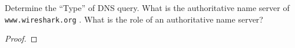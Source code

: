 \documentclass[../../main.tex]{subfiles}
\begin{document}
\begin{wts}
Determine the “Type” of DNS query. What is the authoritative name server of \lstinline{www.wireshark.org} . What is the role of an authoritative name server?
\end{wts}
\begin{proof}

\end{proof}
\end{document}
